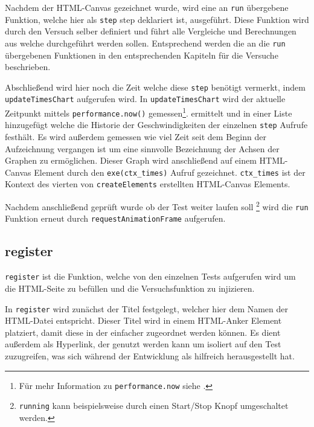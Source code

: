 Nachdem der HTML-Canvas gezeichnet wurde, wird eine an \lstinline{run} übergebene Funktion, welche hier als \lstinline{step} step deklariert ist, ausgeführt.
Diese Funktion wird durch den Versuch selber definiert und führt alle Vergleiche und Berechnungen aus welche durchgeführt werden sollen.
Entsprechend werden die an die \lstinline{run} übergebenen Funktionen in den entsprechenden Kapiteln für die Versuche beschrieben.

Abschlie{\ss}end wird hier noch die Zeit welche diese \lstinline{step} benötigt vermerkt, indem \lstinline{updateTimesChart} aufgerufen wird.
In \lstinline{updateTimesChart} wird der aktuelle Zeitpunkt mittels \lstinline{performance.now()} gemessen\footnote{Für mehr Information zu \lstinline{performance.now} siehe .}.
ermittelt und in einer Liste hinzugefügt welche die Historie der Geschwindigkeiten der einzelnen \lstinline{step} Aufrufe festhält.
Es wird au{\ss}erdem gemessen wie viel Zeit seit dem Beginn der Aufzeichnung vergangen ist um eine sinnvolle Bezeichnung der Achsen der Graphen zu ermöglichen.
Dieser Graph wird anschlie{\ss}end auf einem HTML-Canvas Element durch den \lstinline{exe(ctx_times)} Aufruf gezeichnet.
\lstinline{ctx_times} ist der Kontext des vierten von \lstinline{createElements} erstellten HTML-Canvas Elements.

Nachdem anschlie{\ss}end geprüft wurde ob der Test weiter laufen soll \footnote{\lstinline{running} kann beispielsweise durch einen Start/Stop Knopf umgeschaltet werden.} wird die \lstinline{run} Funktion erneut durch \lstinline{requestAnimationFrame} aufgerufen.

\subsection{register}\label{ch:gtv_register}

\lstinline{register} ist die Funktion, welche von den einzelnen Tests aufgerufen wird um die HTML-Seite zu befüllen und die Versuchsfunktion zu injizieren.

In \lstinline{register} wird zunächst der Titel festgelegt, welcher hier dem Namen der HTML-Datei entspricht.
Dieser Titel wird in einem HTML-Anker Element %
platziert, damit diese in der  einfacher zugeordnet werden können.
Es dient au{\ss}erdem als Hyperlink, der genutzt werden kann um isoliert auf den Test zuzugreifen, was sich während der Entwicklung als hilfreich herausgestellt hat.

